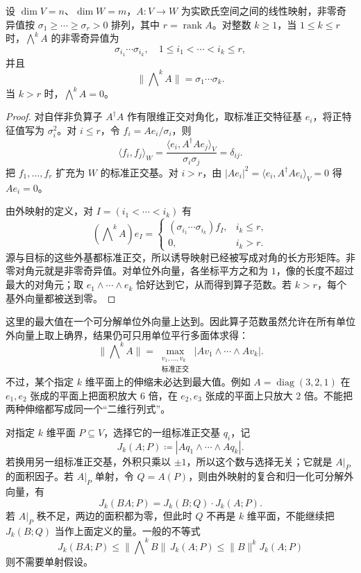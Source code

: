 \begin{theorem}[外映射的奇异值]\label{b1:thm:app-b-exterior-singular-values}
设 \(\dim V=n\)、\(\dim W=m\)，\(A:V\rightarrow W\) 为实欧氏空间之间的线性映射，非零奇异值按
\(\sigma_1\geq\cdots\geq\sigma_r>0\) 排列，其中 \(r=\operatorname{rank}A\)。对整数 \(k\ge1\)，当 \(1\leq k\leq r\) 时，\(\bigwedge^kA\) 的非零奇异值为
\[
 \sigma_{i_1}\cdots\sigma_{i_k},
 \quad 1\leq i_1<\cdots<i_k\leq r,
\]
并且
\[
 \|\bigwedge\nolimits^kA\|
     =\sigma_1\cdots\sigma_k.
\]
当 \(k>r\) 时，\(\bigwedge^kA=0\)。
\end{theorem}
\begin{proof}
对自伴非负算子 \(A^\dagger A\) 作有限维正交对角化，取标准正交特征基 \(e_i\)，将正特征值写为 \(\sigma_i^2\)。对 \(i\leq r\)，令 \(f_i=Ae_i/\sigma_i\)，则
\[
 \langle f_i,f_j\rangle_W
 =\frac{\langle e_i,A^\dagger Ae_j\rangle_V}{\sigma_i\sigma_j}
 =\delta_{ij}.
\]
把 \(f_1,\ldots,f_r\) 扩充为 \(W\) 的标准正交基。对 \(i>r\)，由
\(|Ae_i|^2=\langle e_i,A^\dagger Ae_i\rangle_V=0\) 得 \(Ae_i=0\)。

由外映射的定义，对 \(I=(i_1<\cdots<i_k)\) 有
\[
 (\bigwedge\nolimits^kA)e_I
  =\begin{cases}
     (\sigma_{i_1}\cdots\sigma_{i_k})f_I,&i_k\leq r,\\
     0,&i_k>r.
   \end{cases}
\]
源与目标的这些外基都标准正交，所以诱导映射已经被写成对角的长方形矩阵。非零对角元就是非零奇异值。对单位外向量，各坐标平方之和为 \(1\)，像的长度不超过最大的对角元；取 \(e_1\wedge\cdots\wedge e_k\) 恰好达到它，从而得到算子范数。若 \(k>r\)，每个基外向量都被送到零。
\end{proof}

这里的最大值在一个可分解单位外向量上达到。因此算子范数虽然允许在所有单位外向量上取上确界，结果仍可只用单位平行多面体求得：
\[
 \|\bigwedge\nolimits^kA\|
  =\max_{\substack{v_1,\ldots,v_k\\\text{标准正交}}}
       |Av_1\wedge\cdots\wedge Av_k|.
\]
不过，某个指定 \(k\) 维平面上的伸缩未必达到最大值。例如
\(A=\operatorname{diag}(3,2,1)\) 在 \(e_1,e_2\) 张成的平面上把面积放大 \(6\) 倍，在 \(e_2,e_3\) 张成的平面上只放大 \(2\) 倍。不能把两种伸缩都写成同一个“二维行列式”。

\ProseParagraphBreak

对指定 \(k\) 维平面 \(P\subseteq V\)，选择它的一组标准正交基 \(q_i\)，记
\[
 J_k(A;P)\coloneqq|Aq_1\wedge\cdots\wedge Aq_k|.
\]
若换用另一组标准正交基，外积只乘以 \(\pm1\)，所以这个数与选择无关；它就是 \(A|_P\) 的面积因子。若 \(A|_P\) 单射，令 \(Q=A(P)\)，则由外映射的复合和归一化可分解外向量，有
\[
 J_k(BA;P)=J_k(B;Q)\cdot J_k(A;P).
\]
若 \(A|_P\) 秩不足，两边的面积都为零，但此时 \(Q\) 不再是 \(k\) 维平面，不能继续把 \(J_k(B;Q)\) 当作上面定义的量。一般的不等式
\[
 J_k(BA;P)
 \leq\|\bigwedge\nolimits^kB\|\,J_k(A;P)
 \leq\|B\|^kJ_k(A;P)
\]
则不需要单射假设。

